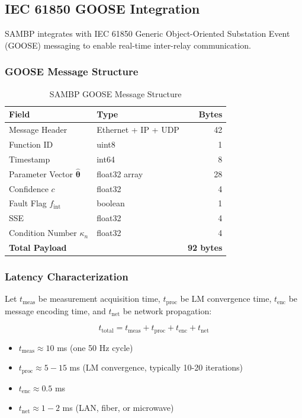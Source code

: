 \documentclass[12pt,a4paper]{article}
\newcommand{\hattheta}{\hat{\boldsymbol{\theta}}}
\newcommand{\kappan}{\kappa_n}
\begin{document}
\subsection{IEC 61850 GOOSE Integration}
\label{subsec:iec61850}

SAMBP integrates with IEC 61850 Generic Object-Oriented Substation Event (GOOSE) messaging 
to enable real-time inter-relay communication.

\subsubsection{GOOSE Message Structure}

\begin{table}[H]
\centering
\caption{SAMBP GOOSE Message Structure}
\label{tab:goose_structure}
\begin{tabular}{llr}
\toprule
\textbf{Field} & \textbf{Type} & \textbf{Bytes} \\
\midrule
Message Header & Ethernet + IP + UDP & 42 \\
Function ID & uint8 & 1 \\
Timestamp & int64 & 8 \\
Parameter Vector $\hattheta$ & float32 array & 28 \\
Confidence $c$ & float32 & 4 \\
Fault Flag $f_{\text{int}}$ & boolean & 1 \\
SSE & float32 & 4 \\
Condition Number $\kappan$ & float32 & 4 \\
\midrule
\textbf{Total Payload} & & \textbf{92 bytes} \\
\bottomrule
\end{tabular}
\end{table}

\subsubsection{Latency Characterization}

Let $t_{\text{meas}}$ be measurement acquisition time, $t_{\text{proc}}$ be LM convergence 
time, $t_{\text{enc}}$ be message encoding time, and $t_{\text{net}}$ be network propagation:

\begin{equation}
t_{\text{total}} = t_{\text{meas}} + t_{\text{proc}} + t_{\text{enc}} + t_{\text{net}}
\label{eq:latency_decomp}
\end{equation}

\begin{itemize}
    \item $t_{\text{meas}} \approx 10$ ms (one 50 Hz cycle)
    \item $t_{\text{proc}} \approx 5-15$ ms (LM convergence, typically 10-20 iterations)
    \item $t_{\text{enc}} \approx 0.5$ ms
    \item $t_{\text{net}} \approx 1-2$ ms (LAN, fiber, or microwave)
\end{itemize}
\end{document}
